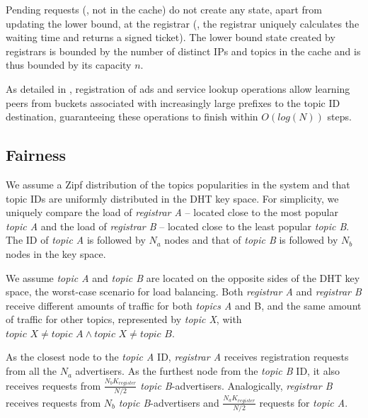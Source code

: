 Pending requests (\ie, not in the cache) do not create any state, apart from updating the lower bound, at the registrar (\ie, the registrar uniquely calculates the waiting time and returns a signed ticket). The lower bound state created by registrars is bounded by the number of distinct IPs and topics in the cache and is thus bounded by its capacity $n$.

As detailed in , registration of ads and service lookup operations allow learning peers from buckets associated with increasingly large prefixes to the topic ID destination, guaranteeing these operations to finish within $O(log(N))$ steps.

\subsection{Fairness}
We assume a Zipf distribution of the topics popularities
in the system and that topic IDs are uniformly distributed in the DHT key space.
For simplicity, we uniquely compare the load of \emph{registrar A} -- located close to the most popular \emph{topic A} and the load of \emph{registrar B} -- located close to the least popular \emph{topic B}.
The ID of \emph{topic A} is followed by $N_a$ nodes and that of \emph{topic B} is followed by $N_b$ nodes in the key space.

We assume \emph{topic A} and \emph{topic B} are located on the opposite sides of the DHT key space, the worst-case scenario for load balancing.
Both \emph{registrar A} and \emph{registrar B} receive different amounts of traffic for both \emph{topics A} and {B}, and the same amount of traffic for other topics, represented by \emph{topic X}, with $\textit{topic X} \neq \textit{topic A} \wedge \textit{topic X} \neq \textit{topic B}$. 

As the closest node to the \emph{topic A} ID, \emph{registrar A} receives registration requests from all the $N_a$ advertisers.
As the furthest node from the \emph{topic B} ID, it also receives requests from $\frac{N_{b}K_\textit{register}}{N/2}$ \emph{topic B}-advertisers.
Analogically, \emph{registrar B} receives requests from $N_b$ \emph{topic B}-advertisers and $\frac{N_{a}K_\textit{register}}{N/2}$ requests for \emph{topic A}.

